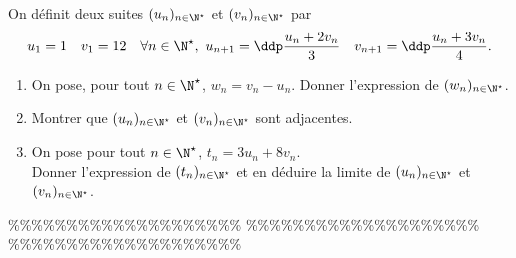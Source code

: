 



\begin{exercice} \;
On d\'efinit deux suites $(u_n)_{n\in\N^{\star}}$ et $(v_n)_{n\in\N^{\star}}$ par 
$$u_1=1\quad v_1=12\quad \forall n\in\N^{\star},\ u_{n+1}=\ddp\frac{u_n+2v_n}{3}\quad v_{n+1}=\ddp\frac{u_n+3v_n}{4}.$$
\begin{enumerate}
 \item
On pose, pour tout $n\in\N^{\star}$, $w_n=v_n-u_n$. Donner l'expression de $(w_n)_{n\in\N^{\star}}$. 
\item 
Montrer que $(u_n)_{n\in\N^{\star}}$ et $(v_n)_{n\in\N^{\star}}$ sont adjacentes.
\item 
On pose pour tout $n\in\N^{\star}$, $t_n=3u_n+8v_n$. \\
Donner l'expression de $(t_n)_{n\in\N^{\star}}$ et en d\'eduire la limite de $(u_n)_{n\in\N^{\star}}$ et $(v_n)_{n\in\N^{\star}}$.
\end{enumerate}
\end{exercice}


\%\%\%\%\%\%\%\%\%\%\%\%\%\%\%\%\%\%\%\%
\%\%\%\%\%\%\%\%\%\%\%\%\%\%\%\%\%\%\%\%
\%\%\%\%\%\%\%\%\%\%\%\%\%\%\%\%\%\%\%\%



